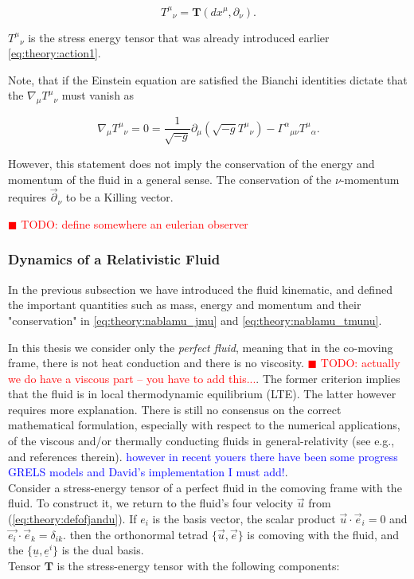\documentclass[11pt,a4paper,headinclude=true,DIV=14,BCOR=8mm,chapterprefix,listof=totoc,twoside,openright,abstracton]{scrbook}
\newcommand{\todo}[1]{\textcolor{red}{$\blacksquare$ TODO: #1}}
\begin{document}
\begin{equation}
{T^{\mu}}_{\nu}=\boldsymbol{T}(dx^{\mu},\partial_{\nu}).
\end{equation}

${T^{\mu}}_{\nu}$ is the stress energy tensor that was already introduced earlier \ref{eq:theory:action1}. 

Note, that if the Einstein equation are satisfied the Bianchi identities dictate that the $\nabla_{\mu}{T^{\mu}}_{\nu}$ must vanish as

\begin{equation}
\nabla_{\mu}{T^{\mu}}_{\nu} = 0= \frac{1}{\sqrt{-g}}\partial_{\mu}(\sqrt{-g}{T^{\mu}}_{\nu}) - {\Gamma^{\alpha}}_{\mu\nu}{T^{\mu}}_{\alpha}.
\label{eq:theory:nablamu_tmunu}
\end{equation}

However, this statement does not imply the conservation of the energy and momentum of the fluid in a general sense. The conservation of the $\nu$-momentum requires $\vec{\partial}_{\nu}$ to be a Killing vector.


\todo{define somewhere an eulerian observer}

\subsubsection{Dynamics of a Relativistic Fluid}

In the previous subsection we have introduced the fluid kinematic, and defined the important quantities such as mass, energy and momentum and their "conservation" in \ref{eq:theory:nablamu_jmu} and \ref{eq:theory:nablamu_tmunu}.

In this thesis we consider only the \textit{perfect fluid}, meaning that in the co-moving frame, there is not heat conduction and there is no viscosity. \todo{actually we do have a viscous part -- you have to add this...}. The former criterion implies that the fluid is in local thermodynamic equilibrium (LTE). The latter however requires more explanation. There is still no consensus on the correct mathematical formulation, especially with respect to the numerical applications, of the viscous and/or thermally conducting fluids in general-relativity (see e.g., \cite{Andersson:2006nr} and references therein). \textcolor{blue}{however in recent youers there have been some progress GRELS models and David's implementation I must add!}. \\

Consider a stress-energy tensor of a perfect fluid in the comoving frame with the fluid. To construct it, we return to the fluid's four velocity $\vec{u}$ from (\ref{eq:theory:defofjandu}). If $e_{i}$ is the basis vector, the scalar product $\vec{u}\cdot\vec{e}_i=0$ and $\vec{e_i}\cdot\vec{e}_k = \delta_{ik}$. then the orthonormal tetrad $\{\vec{u},\vec{e}\}$ is comoving with the fluid, and the $\{\underline{u},\underline{e}^i\}$ is the dual basis. \\
Tensor $\boldsymbol{T}$ is the stress-energy tensor with the following components: 
\end{document}

